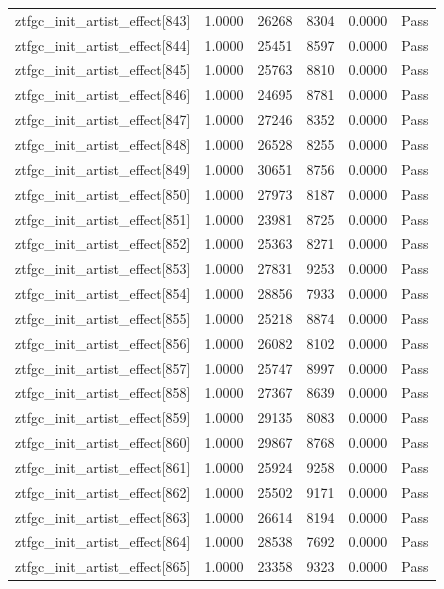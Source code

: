 \begin{table}[htbp]
\begin{tabular}{llrrll}
ztfgc\_init\_artist\_effect[843] & 1.0000 & 26268 & 8304 & 0.0000 & Pass \\
ztfgc\_init\_artist\_effect[844] & 1.0000 & 25451 & 8597 & 0.0000 & Pass \\
ztfgc\_init\_artist\_effect[845] & 1.0000 & 25763 & 8810 & 0.0000 & Pass \\
ztfgc\_init\_artist\_effect[846] & 1.0000 & 24695 & 8781 & 0.0000 & Pass \\
ztfgc\_init\_artist\_effect[847] & 1.0000 & 27246 & 8352 & 0.0000 & Pass \\
ztfgc\_init\_artist\_effect[848] & 1.0000 & 26528 & 8255 & 0.0000 & Pass \\
ztfgc\_init\_artist\_effect[849] & 1.0000 & 30651 & 8756 & 0.0000 & Pass \\
ztfgc\_init\_artist\_effect[850] & 1.0000 & 27973 & 8187 & 0.0000 & Pass \\
ztfgc\_init\_artist\_effect[851] & 1.0000 & 23981 & 8725 & 0.0000 & Pass \\
ztfgc\_init\_artist\_effect[852] & 1.0000 & 25363 & 8271 & 0.0000 & Pass \\
ztfgc\_init\_artist\_effect[853] & 1.0000 & 27831 & 9253 & 0.0000 & Pass \\
ztfgc\_init\_artist\_effect[854] & 1.0000 & 28856 & 7933 & 0.0000 & Pass \\
ztfgc\_init\_artist\_effect[855] & 1.0000 & 25218 & 8874 & 0.0000 & Pass \\
ztfgc\_init\_artist\_effect[856] & 1.0000 & 26082 & 8102 & 0.0000 & Pass \\
ztfgc\_init\_artist\_effect[857] & 1.0000 & 25747 & 8997 & 0.0000 & Pass \\
ztfgc\_init\_artist\_effect[858] & 1.0000 & 27367 & 8639 & 0.0000 & Pass \\
ztfgc\_init\_artist\_effect[859] & 1.0000 & 29135 & 8083 & 0.0000 & Pass \\
ztfgc\_init\_artist\_effect[860] & 1.0000 & 29867 & 8768 & 0.0000 & Pass \\
ztfgc\_init\_artist\_effect[861] & 1.0000 & 25924 & 9258 & 0.0000 & Pass \\
ztfgc\_init\_artist\_effect[862] & 1.0000 & 25502 & 9171 & 0.0000 & Pass \\
ztfgc\_init\_artist\_effect[863] & 1.0000 & 26614 & 8194 & 0.0000 & Pass \\
ztfgc\_init\_artist\_effect[864] & 1.0000 & 28538 & 7692 & 0.0000 & Pass \\
ztfgc\_init\_artist\_effect[865] & 1.0000 & 23358 & 9323 & 0.0000 & Pass \\

\end{tabular}
\end{table}

